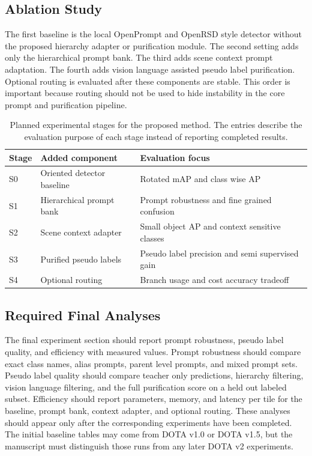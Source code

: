 \documentclass[10pt]{article}
\begin{document}
\subsection{Ablation Study}

The first baseline is the local OpenPrompt and OpenRSD style detector without the proposed hierarchy adapter or purification module. The second setting adds only the hierarchical prompt bank. The third adds scene context prompt adaptation. The fourth adds vision language assisted pseudo label purification. Optional routing is evaluated after these components are stable. This order is important because routing should not be used to hide instability in the core prompt and purification pipeline.

\begin{table}[t]
\centering
\small
\caption{Planned experimental stages for the proposed method. The entries describe the evaluation purpose of each stage instead of reporting completed results.}
\begin{tabular}{lll}
\toprule
Stage & Added component & Evaluation focus \\
\midrule
S0 & Oriented detector baseline & Rotated mAP and class wise AP \\
S1 & Hierarchical prompt bank & Prompt robustness and fine grained confusion \\
S2 & Scene context adapter & Small object AP and context sensitive classes \\
S3 & Purified pseudo labels & Pseudo label precision and semi supervised gain \\
S4 & Optional routing & Branch usage and cost accuracy tradeoff \\
\bottomrule
\end{tabular}
\label{tab:ablation}
\end{table}

\subsection{Required Final Analyses}

The final experiment section should report prompt robustness, pseudo label quality, and efficiency with measured values. Prompt robustness should compare exact class names, alias prompts, parent level prompts, and mixed prompt sets. Pseudo label quality should compare teacher only predictions, hierarchy filtering, vision language filtering, and the full purification score on a held out labeled subset. Efficiency should report parameters, memory, and latency per tile for the baseline, prompt bank, context adapter, and optional routing. These analyses should appear only after the corresponding experiments have been completed. The initial baseline tables may come from DOTA v1.0 or DOTA v1.5, but the manuscript must distinguish those runs from any later DOTA v2 experiments.
\end{document}
